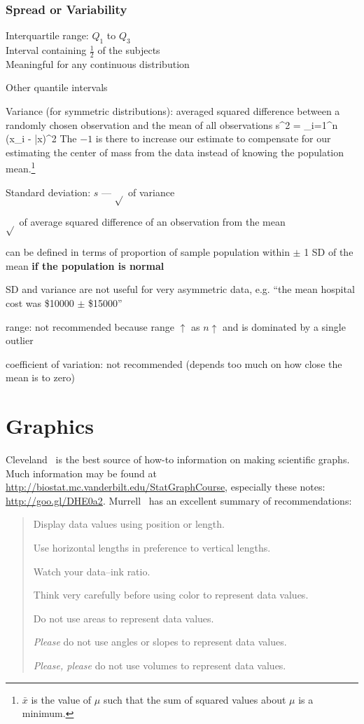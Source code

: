 \subsubsection{Spread or Variability}
\bi
\item Interquartile range: $Q_{1}$ to $Q_{3}$ \\
Interval containing $\frac{1}{2}$ of the subjects \\
Meaningful for any continuous distribution
\item Other quantile intervals
\item Variance (for symmetric distributions): averaged squared
  difference between a randomly chosen observation and the mean of all
  observations
\beq
s^{2} =  \sum_{i=1}^{n} (x_{i} - \bar{x})^2
\eeq
The $-1$ is there to increase our estimate to compensate for our
estimating the center of mass from the data instead of knowing the
population mean.\footnote{$\bar{x}$ is the value of $\mu$ such that
  the sum of squared values about $\mu$ is a minimum.}
\item Standard deviation: $s$ --- $\sqrt{}$ of variance
 \bi 
 \item $\sqrt{}$ of average squared difference of an observation from
   the mean
 \item can be defined in terms of proportion of sample population within
   $\pm$ 1 SD of the mean \textbf{if the population is normal}
 \ei
\item SD and variance are not useful for very asymmetric data,
  e.g. ``the mean hospital cost was \$10000 $\pm$ \$15000''
\item range: not recommended because range $\uparrow$ as $n\uparrow$
  and is dominated by a single outlier
\item coefficient of variation: not recommended (depends too much on
  how close the mean is to zero)
\ei
\clearpage
\section{Graphics} 
Cleveland~\cite{cle94ele,cle84sci} is the best source of how-to
information on making scientific graphs.  Much information may be
found at \url{http://biostat.mc.vanderbilt.edu/StatGraphCourse},
especially these notes: \url{http://goo.gl/DHE0a2}.
Murrell~\cite{mur13inf} has an excellent summary of recommendations:
\begin{quote}
\bi
\item Display data values using position or length.
\item Use horizontal lengths in preference to vertical lengths.
\item Watch your data--ink ratio.
\item Think very carefully before using color to represent data
  values.
\item Do not use areas to represent data values.
\item \emph{Please} do not use angles or slopes to represent data
  values.
\item \emph{Please, please} do not use volumes to represent data
  values.
\ei
\end{quote}

